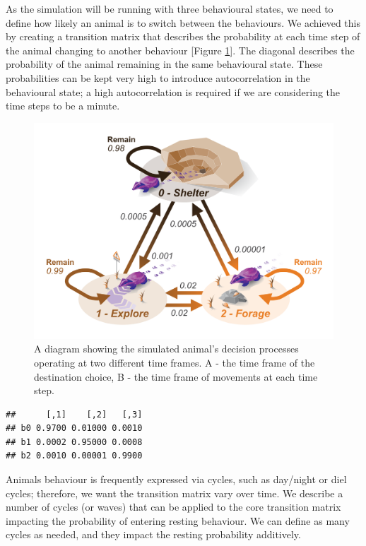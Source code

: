 \documentclass[10pt,a4paper]{article}
\begin{document}
As the simulation will be running with three behavioural states, we need to define how likely an animal is to switch between the behaviours.
We achieved this by creating a transition matrix that describes the probability at each time step of the animal changing to another behaviour {[}Figure \ref{fig:transMatrixDiagram}{]}.
The diagonal describes the probability of the animal remaining in the same behavioural state.
These probabilities can be kept very high to introduce autocorrelation in the behavioural state; a high autocorrelation is required if we are considering the time steps to be a minute.

\begin{figure}

{\centering \includegraphics[width=0.8\linewidth]{../ext_figures/Tranistion Matrix Diagram} 

}

\caption{A diagram showing the simulated animal's decision processes operating at two different time frames. A - the time frame of the destination choice, B - the time frame of movements at each time step.}\label{fig:transMatrixDiagram}
\end{figure}

\begin{verbatim}
##      [,1]    [,2]   [,3]
## b0 0.9700 0.01000 0.0010
## b1 0.0002 0.95000 0.0008
## b2 0.0010 0.00001 0.9900
\end{verbatim}

Animals behaviour is frequently expressed via cycles, such as day/night or diel cycles; therefore, we want the transition matrix vary over time.
We describe a number of cycles (or waves) that can be applied to the core transition matrix impacting the probability of entering resting behaviour.
We can define as many cycles as needed, and they impact the resting probability additively.
\end{document}
